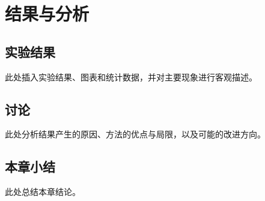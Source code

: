 \chapter{结果与分析}

\section{实验结果}

此处插入实验结果、图表和统计数据，并对主要现象进行客观描述。

\section{讨论}

此处分析结果产生的原因、方法的优点与局限，以及可能的改进方向。

\section{本章小结}

此处总结本章结论。
